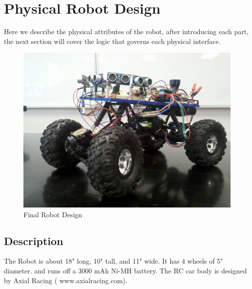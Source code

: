 \documentclass[12pt]{article}
\begin{document}
\clearpage
\section{Physical Robot Design}
Here we describe the physical attributes of the robot, after introducing each part, the next section will cover the logic that governs each physical interface.
\begin{figure}[h]
\centerline{\includegraphics[scale=.75]{img/bigBot2}}
\caption{Final Robot Design}
\end{figure}
\subsection{Description}
The Robot is about 18" long, 10" tall, and 11" wide.  It has 4 wheels of 5" diameter. and runs off a 3000 mAh Ni-MH battery.  The RC car body is designed by Axial Racing ({\color{blue} www.axialracing.com}).
\end{document}

